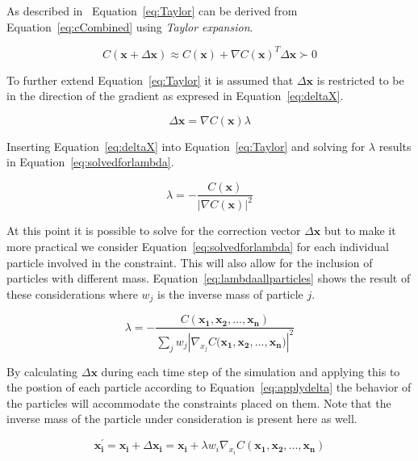 As described in~\cite{macklin2013position} Equation~\ref{eq:Taylor} can be
derived from Equation~\ref{eq:cCombined} using \textit{Taylor expansion}.

\begin{equation}
\label{eq:Taylor}
C(\mathbf{x} + \Delta \mathbf{x}) \approx C(\mathbf{x}) + \nabla C(\mathbf{x})^{T} \Delta \mathbf{x} \succ 0
\end{equation}

To further extend Equation~\ref{eq:Taylor} it is assumed that $ \Delta
\mathbf{x} $ is restricted to be in the direction of the gradient as expresed
in Equation~\ref{eq:deltaX}.

\begin{equation}
\label{eq:deltaX}
\Delta \mathbf{x} = \nabla C(\mathbf{x}) \lambda
\end{equation}

Inserting Equation~\ref{eq:deltaX} into Equation~\ref{eq:Taylor} and solving for $ \lambda $ results in Equation~\ref{eq:solvedforlambda}.

\begin{equation}
\label{eq:solvedforlambda}
\lambda = - \frac{C(\mathbf{x})}{\left | \nabla C(\mathbf{x}) \right |^2}
\end{equation}

At this point it is possible to solve for the correction vector $ \Delta
\mathbf{x} $ but to make it more practical we consider
Equation~\ref{eq:solvedforlambda} for each individual particle involved in the
constraint. This will also allow for the inclusion of particles with different
mass. Equation~\ref{eq:lambdaallparticles} shows the result of these
considerations where $ w_{j} $ is the inverse mass of particle $ j $.

\begin{equation}
\label{eq:lambdaallparticles}
\lambda = - \frac{C(\mathbf{x_{1}}, \mathbf{x_{2}}, ..., \mathbf{x_{n}})}{\sum_{j} w_{j} \left | \nabla_{x_{j}} C(\mathbf{x_{1}, \mathbf{x_{2}}, ..., \mathbf{x_{n}})} \right |^2}
\end{equation}

By calculating $ \Delta \mathbf{x} $ during each time step of the simulation
and applying this to the postion of each particle according to
Equation~\ref{eq:applydelta} the behavior of the particles will accommodate the
constraints placed on them. Note that the inverse mass of the particle under
consideration is present here as well.

\begin{equation}
\label{eq:applydelta}
\mathbf{x_{i}^{'}} = \mathbf{x_{i}} + \Delta \mathbf{x_{i}} = \mathbf{x_{i}} + \lambda w_{i} \nabla_{x_{i}} C(\mathbf{x_{1}}, \mathbf{x_{2}}, ..., \mathbf{x_{n}})
\end{equation}

